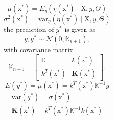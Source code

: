 \documentclass[10pt,hyperref={pdfpagelabels=false}]{beamer}
\begin{document}
\begin{frame}[fragile]
\begin{columns}
\begin{equation*}\label{e10}
     \mu (\mathrm{x}^*)=E_{\eta}\left ( \eta(\mathrm{x}^*)\mid \mathrm{X}, y, \Theta \right )
\end{equation*}
\begin{equation*}\label{e11}
     \sigma^2(\mathrm{x}^*)=\mathrm{var}_{\eta}\left ( \eta(\mathrm{x}^*)\mid \mathrm{X}, y, \Theta \right )
\end{equation*}
the prediction of $y^*$ is given as
 \begin{equation}\label{e12}
     y, y^* \sim\mathcal{N}(0, \mathbb{K}_{n+1}),
 \end{equation}
with covariance matrix
\begin{equation*}\label{e13}
    \mathbb{K}_{n+1}=\begin{bmatrix}
 \mathbb{K}& k(\mathrm{x}^*)\\ 
k^T(\mathrm{x}^*) & \boldsymbol{K}(\mathrm{x}^*)
\end{bmatrix}.
\end{equation*}
\begin{equation*}\label{e14}
    E(y^*)=\mu(\mathrm{x}^*)=k^T(\mathrm{x}^*)\mathbb{K}^{-1}y
\end{equation*}
\begin{align*}\label{e15}
   \mathrm{ var}(y^*)=\sigma(\mathrm{x}^*)=\\\boldsymbol{K}(\mathrm{x}^*)-k^T(\mathrm{x}^*)\mathbb{K}^{-1}k(\mathrm{x}^*)
\end{align*} 

\end{columns}
\end{frame}
\end{document}

